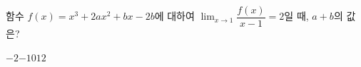 함수 $f(x)=x^3+2ax^2+bx-2b$에 대하여 $\displaystyle\lim_{x\to 1}\dfrac{f(x)}{x-1}=2$일 때, $a+b$의 값은? 
\begin{choices32}{$-2$}{$-1$}{$0$}{$1$}{$2$}\end{choices32}
